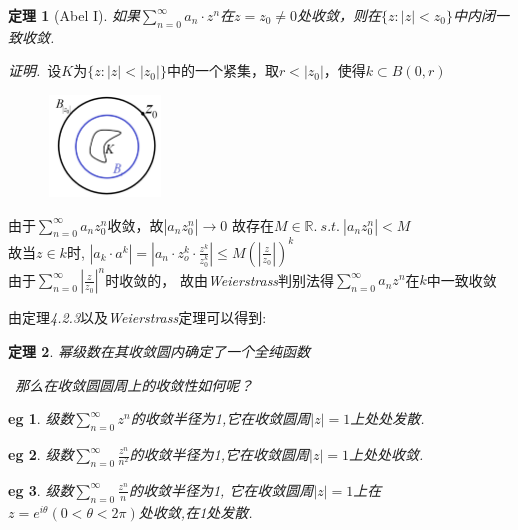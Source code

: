 \documentclass[b5paper,decoration]{qyxf-book}%
\newtheorem{mypro}{定理}[section]%
\newtheorem*{eg}{eg}%
\begin{document}
\begin{mypro}[Abel I]
    如果$\displaystyle{\sum\limits_{n=0}^\infty a_n\cdot z^n}$在$z=z_0\neq0$处收敛，则在$\{z:|z|<z_0\}$中内闭一致收敛.
\end{mypro}
\noindent\emph{证明.}\ 设$K$为$\{z:|z|<|z_0|\}$中的一个紧集，取$r<|z_0|$，使得$k\subset B(0,r)$
\begin{figure}
    \centering
    \includegraphics[width=3cm,height=2.7cm]{ch4_p3.png}
\end{figure}
由于$\displaystyle{\sum\limits_{n=0}^\infty a_nz_0^n}$收敛，故$\left|a_nz_0^n\right|\rightarrow0$
故存在$M\in\mathbb{R}.\ s.t.\ \left|a_nz_0^n\right|<M$\\
故当$z\in k$时,
$\displaystyle{\left|a_k\cdot a^k\right|=\left|a_n\cdot z_o^k\cdot \frac{z^k}{z_0^k}\right|\leq M\left(\left|\frac{z}{z_0}\right|\right)^k}$\\
由于$\displaystyle{\sum\limits_{n=0}^\infty\left|\frac{z}{z_0}\right|^n}$时收敛的，
故由\emph{Weierstrass}判别法得$\displaystyle{\sum\limits_{n=0}^\infty a_nz^n}$在$k$中一致收敛\\\rightline{$\square$}


\noindent 由定理\emph{4.2.3}以及\emph{Weierstrass}定理可以得到:

\begin{mypro}
    幂级数在其收敛圆内确定了一个全纯函数\par
    \qquad\quad\, 那么在收敛圆圆周上的收敛性如何呢？
\end{mypro}

\begin{eg}
    级数$\displaystyle{\sum\limits_{n=0}^\infty z^n}$的收敛半径为1,它在收敛圆周$|z|=1$上处处发散.
\end{eg}

\begin{eg}
    级数$\displaystyle{\sum\limits_{n=0}^\infty \frac{z^n}{n^2}}$的收敛半径为1,它在收敛圆周$|z|=1$上处处收敛.
\end{eg}

\begin{eg}
    级数$\displaystyle{\sum\limits_{n=0}^\infty \frac{z^n}{n}}$的收敛半径为1,
    它在收敛圆周$|z|=1$上在$z=e^{i\theta}(0<\theta<2\pi)$处收敛,在1处发散.
\end{eg}
\end{document}
